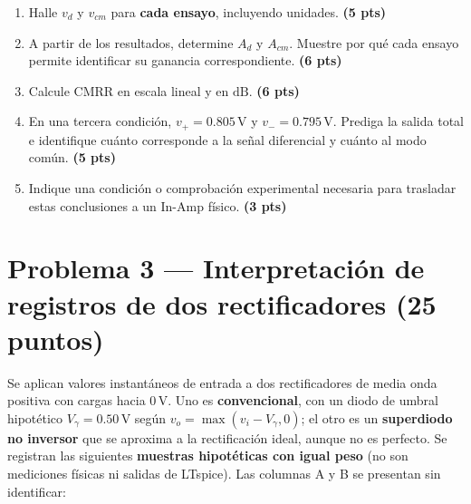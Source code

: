\documentclass[10pt, a4paper]{article}
\begin{document}
\begin{enumerate}
    \setlength{\itemsep}{2pt}
    \item Halle $v_d$ y $v_{cm}$ para \textbf{cada ensayo}, incluyendo unidades. \hfill \textbf{(5 pts)}
    \item A partir de los resultados, determine $A_d$ y $A_{cm}$. Muestre por qué cada ensayo permite identificar su ganancia correspondiente. \hfill \textbf{(6 pts)}
    \item Calcule $\mathrm{CMRR}$ en escala lineal y en $\mathrm{dB}$. \hfill \textbf{(6 pts)}
    \item En una tercera condición, $v_+ = 0.805\,\mathrm{V}$ y $v_- = 0.795\,\mathrm{V}$. Prediga la salida total e identifique cuánto corresponde a la señal diferencial y cuánto al modo común. \hfill \textbf{(5 pts)}
    \item Indique una condición o comprobación experimental necesaria para trasladar estas conclusiones a un In-Amp físico. \hfill \textbf{(3 pts)}
\end{enumerate}

\section*{Problema 3 --- Interpretación de registros de dos rectificadores (25 puntos)}

Se aplican valores instantáneos de entrada a dos rectificadores de media onda positiva con cargas hacia $0\,\mathrm{V}$. Uno es \textbf{convencional}, con un diodo de umbral hipotético $V_\gamma = 0.50\,\mathrm{V}$ según $v_o = \max(v_i - V_\gamma, 0)$; el otro es un \textbf{superdiodo no inversor} que se aproxima a la rectificación ideal, aunque no es perfecto. Se registran las siguientes \textbf{muestras hipotéticas con igual peso} (no son mediciones físicas ni salidas de LTspice). Las columnas A y B se presentan sin identificar:
\end{document}
